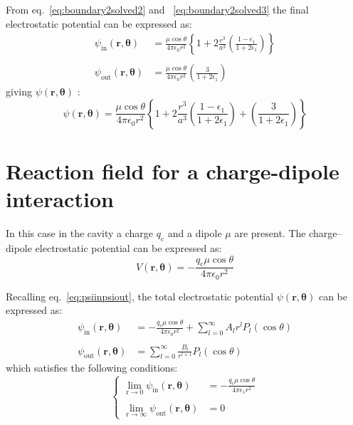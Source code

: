 \documentclass[11pt,oneside,a4paper]{article}
\begin{document}
From eq.~\ref{eq:boundary2solved2} and ~\ref{eq:boundary2solved3} the final electrostatic potential can be expressed as:
\begin{equation}
\label{eq:finalpsi}
\begin{align} 
\psi_\mathrm{in}(\mathbf{r},\mathbf{\theta}) &= \frac{\mu\cos\theta}{4\pi\epsilon_0 r^2} \left\{ 1+ 2\frac{r^3}{a^3} \left ( \frac{1 - \epsilon_1}{1 + 2\epsilon_1} \right)  \right \} \\
\\
\psi_\mathrm{out}(\mathbf{r},\mathbf{\theta}) &= \frac{\mu\cos\theta}{4\pi\epsilon_0 r^2} \left ( \frac{3}{1 + 2\epsilon_1} \right ) 
 \end{align}
\end{equation}
giving $\psi(\mathbf{r},\mathbf{\theta})$ :
\begin{equation}
 \psi(\mathbf{r},\mathbf{\theta}) = \frac{\mu\cos\theta}{4\pi\epsilon_0 r^2}\left\{1 + 2\frac{r^3}{a^3}\left ( \frac{1 - \epsilon_1}{1 + 2\epsilon_1} \right ) + \left ( \frac{ 3}{1 + 2\epsilon_1} \right ) \right \}
\end{equation}

\section{Reaction field for a charge-dipole interaction}
\label{sec:chargedipole}

In this case in the cavity a charge $q_\mathrm{c}$ and a dipole $\mu$ are present. The charge--dipole electrostatic potential can be expressed as:
\begin{equation}
 \label{eq:chargedipoleint}
 V(\mathbf{r},\mathbf{\theta}) = -\frac{q_\mathrm{c}\mu\cos\theta}{4\pi\epsilon_0 r^2}
\end{equation}

Recalling eq.~\ref{eq:psiinpsiout}, the total electrostatic potential  $\psi(\mathbf{r},\mathbf{\theta})$ can be expressed as:
\begin{equation}
 \label{eq:qdpsiinpsiout}
 \begin{align} 
 \psi_\mathrm{in}(\mathbf{r},\mathbf{\theta}) &= -\frac{q_\mathrm{c}\mu \cos\theta}{4\pi\epsilon_0 r^2} + \sum_{l=0}^\infty A_{l} r^{l}P_{l}(\cos\theta) \\
 \\
 \psi_\mathrm{out}(\mathbf{r},\mathbf{\theta}) &= \sum_{l=0}^\infty \frac{B_{l}}{r^{l+1}} P_{l}(\cos\theta) 
  \end{align}
\end{equation}
which satisfies the following conditions:
\begin{equation}
\begin{cases}
 \lim_{\mathrm{r\to 0}} \psi_\mathrm{in}(\mathbf{r},\mathbf{\theta}) &= -\frac{q_\mathrm{c}\mu\cos\theta}{4\pi\epsilon_1 r^2}\\
 \\
 \lim_{\mathrm{r\to \infty}} \psi_\mathrm{out}(\mathbf{r},\mathbf{\theta}) &=  0
\end{cases}
\end{equation}
\end{document}
